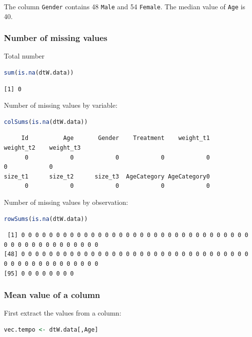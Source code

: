 \documentclass{article}
\begin{document}
The column \texttt{Gender} contains 48 \texttt{Male} and 54 \texttt{Female}. The median
value of \texttt{Age} is 40.
\subsubsection{Number of missing values}
\label{sec:orgc2babc7}

Total number
\begin{lstlisting}[language=r,numbers=none]
sum(is.na(dtW.data))
\end{lstlisting}

\label{}
\begin{verbatim}
[1] 0
\end{verbatim}


Number of missing values by variable:
\begin{lstlisting}[language=r,numbers=none]
colSums(is.na(dtW.data))
\end{lstlisting}

\label{}
\begin{verbatim}
     Id          Age       Gender    Treatment    weight_t1    weight_t2    weight_t3 
      0            0            0            0            0            0            0 
size_t1      size_t2      size_t3  AgeCategory AgeCategory0 
      0            0            0            0            0
\end{verbatim}


Number of missing values by observation:
\begin{lstlisting}[language=r,numbers=none]
rowSums(is.na(dtW.data))
\end{lstlisting}

\label{}
\begin{verbatim}
 [1] 0 0 0 0 0 0 0 0 0 0 0 0 0 0 0 0 0 0 0 0 0 0 0 0 0 0 0 0 0 0 0 0 0 0 0 0 0 0 0 0 0 0 0 0 0 0 0
[48] 0 0 0 0 0 0 0 0 0 0 0 0 0 0 0 0 0 0 0 0 0 0 0 0 0 0 0 0 0 0 0 0 0 0 0 0 0 0 0 0 0 0 0 0 0 0 0
[95] 0 0 0 0 0 0 0 0
\end{verbatim}
\subsubsection{Mean value of a column}
\label{sec:org6a2ba4b}

First extract the values from a column:
\begin{lstlisting}[language=r,numbers=none]
vec.tempo <- dtW.data[,Age]
\end{lstlisting}
\end{document}

